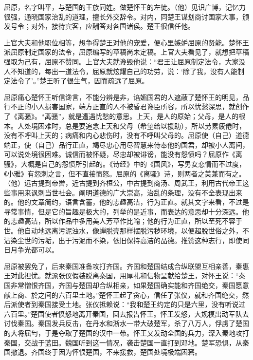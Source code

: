 \documentclass[12pt,UTF-8,openany,a4]{ctexbook}
\begin{document}
\begin{large}\yiwen
    
    屈原，名字叫平，与楚国的王族同姓。做楚怀王的左徒。（他）见识广博，记忆力很强，通晓国家治乱的道理，擅长外交辞令。对内，同楚王谋划商讨国家大事，颁发号令；对外，接待宾客，应酬答对各国诸侯。楚王很信任他。
    
    上官大夫和他职位相等，想争得楚王对他的宠爱，便心里嫉妒屈原的贤能。楚怀王派屈原制定国家的法令，屈原编写的草稿尚未定稿。上官大夫看见了，就想把草稿强取为己有，屈原不赞同。上官大夫就谗毁他说：“君王让屈原制定法令，大家没人不知道的，每出一道法令，屈原就炫耀自己的功劳，说：‘除了我，没有人能制定法令了’。”楚王听了很生气，因而疏远了屈原。
    
    屈原痛心楚怀王听信谗言，不能分辨是非，谄媚国君的人遮蔽了楚怀王的明见，品行不正的小人损害国家，端方正直的人不被昏君谗臣所容，所以忧愁深思，就创作了《离骚》。“离骚”，就是遭遇忧愁的意思。上天，是人的原始；父母，是人的根本。人处境困难时，总是要追念上天和父母（希望给以援助），所以劳累疲倦时，没有不呼叫上天的；病痛和内心悲伤时，没有不呼叫父母的。屈原使（自己）道德端正，使（自己）品行正直，竭尽忠心用尽智慧来侍奉他的国君，却被小人离间，可以说处境很困难。诚信而被怀疑，尽忠却被诽谤，能没有怨愤吗？屈原作《离骚》，大概是自己的怨愤所引起的。《诗经》中的《国风》，写男女恋情而不过度，《小雅》有怨刺之言，但不直接愤怒。屈原的《离骚》诗，则两者之美兼而有之。（他）远古提到帝喾，近古提到齐桓公，中古提到商汤、周武王，利用古代帝王这些事用来讽刺当世社会。阐明道德的广大崇高，治乱的条理，没有不全表现出来的。他的文章简约，语言含蓄，他的志趣高洁，行为正直。就其文字来看，不过是寻常事情，但是它的旨趣是极大的，列举的是近事，而表达的意思却十分深远。他的志趣高洁，所以作品中多用美人芳草作比喻；他的行为正直，所以至死不容于世。他自动地远离污泥浊水，像蝉脱壳那样摆脱污秽环境，以便超脱世俗之外，不沾染尘世的污垢，出于污泥而不染，依旧保持高洁的品德。推赞这种志行，即使同日月争光都可以。
    
    屈原被罢免了，后来秦国准备攻打齐国。齐国和楚国结成合纵联盟互相亲善，秦惠王对此担忧。就派张仪假装脱离秦国，用厚礼和信物呈献给楚王，对怀王说：“秦国非常憎恨齐国，齐国与楚国却合纵相亲，如果楚国确实能和齐国绝交，秦国愿意献上商、於之间的六百里土地。”楚怀王起了贪心，信任了张仪，就和齐国绝交，然后派使者到秦国接受土地。张仪抵赖说：“我和楚王约定的只是六里，没有听说过六百里。”楚国使者愤怒地离开秦国，回去报告怀王。怀王发怒，大规模出动军队去讨伐秦国。秦国发兵反击，在丹水和淅水一带大破楚军，杀了八万人，俘虏了楚国的大将屈匄，于是夺取了楚国的汉中一带。怀王又发动全国的兵力，深入秦地攻打秦国，交战于蓝田。魏国听到这一情况，袭击楚国一直打到邓地。楚军恐惧，从秦国撤退。齐国终于因为怀恨楚国，不来援救，楚国处境极端困窘。
    

\end{large}
\end{document}
